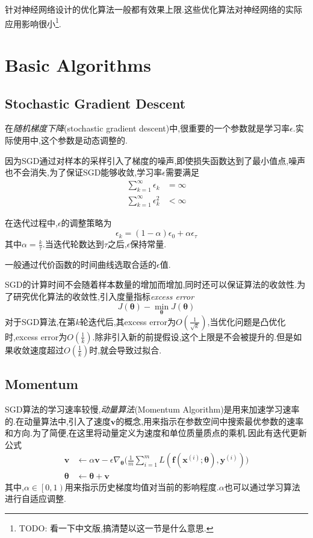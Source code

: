 针对神经网络设计的优化算法一般都有效果上限.这些优化算法对神经网络的实际应用影响很小\footnote{TODO: 看一下中文版,搞清楚以这一节是什么意思.}.

\section{Basic Algorithms}

\subsection{Stochastic Gradient Descent}

在\textit{随机梯度下降}(stochastic gradient descent)中,很重要的一个参数就是学习率$\epsilon$.实际使用中,这个参数是动态调整的.

因为SGD通过对样本的采样引入了梯度的噪声,即使损失函数达到了最小值点,噪声也不会消失,为了保证SGD能够收敛,学习率$\epsilon$需要满足
\begin{equation}\begin{split}
\sum_{k=1}^\infty\epsilon_k&=\infty\\
\sum_{k=1}^\infty\epsilon_k^2&<\infty
\end{split}\end{equation}

在迭代过程中,$\epsilon$的调整策略为
\begin{equation}
\epsilon_k=(1-\alpha)\epsilon_0+\alpha\epsilon_\tau
\end{equation}
其中$\alpha=\frac{k}{\tau}$.当迭代轮数达到$\tau$之后,$\epsilon$保持常量.

一般通过代价函数的时间曲线选取合适的$\epsilon$值.

SGD的计算时间不会随着样本数量的增加而增加,同时还可以保证算法的收敛性.为了研究优化算法的收敛性,引入度量指标\textit{excess error}
\begin{equation}
J(\bm\theta)-\min_{\bm\theta}J(\bm\theta)
\end{equation}
对于SGD算法,在第$k$轮迭代后,其excess error为$O(\frac{1}{\sqrt{k}})$,当优化问题是凸优化时,excess error为$O(\frac{1}{k})$.除非引入新的前提假设,这个上限是不会被提升的.但是如果收敛速度超过$O(\frac{1}{k})$时,就会导致过拟合.

\subsection{Momentum}

SGD算法的学习速率较慢,\textit{动量算法}(Momentum Algorithm)是用来加速学习速率的.在动量算法中,引入了速度$\bm v$的概念,用来指示在参数空间中搜索最优参数的速率和方向.为了简便,在这里将动量定义为速度和单位质量质点的乘机.因此有迭代更新公式
\begin{equation}\begin{split}
\bm v&\leftarrow\alpha\bm v-\epsilon\nabla_{\bm\theta}\Big(\frac{1}{m}\sum_{i=1}^mL(\bm f(\bm x^{(i)};\bm\theta),\bm y^{(i)})\Big)\\
\bm\theta&\leftarrow\bm\theta+\bm v
\end{split}\end{equation}
其中,$\alpha\in\left[0,1\right)$用来指示历史梯度均值对当前的影响程度.$\alpha$也可以通过学习算法进行自适应调整.

